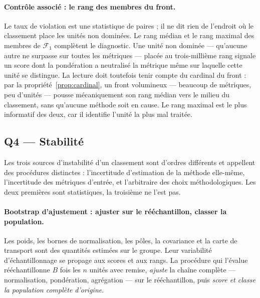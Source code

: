 \documentclass[11pt,a4paper]{article}
\theoremstyle{definition}
\theoremstyle{remark}
\begin{document}
\paragraph{Contrôle associé : le rang des membres du front.} Le taux de violation est une
statistique de paires ; il ne dit rien de l'endroit où le classement place les unités non
dominées. Le rang médian et le rang maximal des membres de $\mathcal{F}_1$ complètent le
diagnostic. Une unité non dominée --- qu'aucune autre ne surpasse sur toutes les
métriques --- placée au trois-millième rang signale un score dont la pondération a
neutralisé la métrique même sur laquelle cette unité se distingue. La lecture doit
toutefois tenir compte du cardinal du front : par la propriété~\ref{prop:cardinal}, un
front volumineux --- beaucoup de métriques, peu d'unités --- pousse mécaniquement son rang
médian vers le milieu du classement, sans qu'aucune méthode soit en cause. Le rang maximal
est le plus informatif des deux, car il identifie l'unité la plus mal traitée.

\bigskip

\subsection{Q4 --- Stabilité}
\label{sec:q4}

\medskip

Les trois sources d'instabilité d'un classement sont d'ordres différents et appellent des
procédures distinctes : l'incertitude d'estimation de la méthode elle-même, l'incertitude
des métriques d'entrée, et l'arbitraire des choix méthodologiques. Les deux premières sont
statistiques, la troisième ne l'est pas.

\bigskip

\paragraph{Bootstrap d'ajustement : ajuster sur le rééchantillon, classer la population.}
Les poids, les bornes de normalisation, les pôles, la covariance et la carte de transport
sont des quantités estimées sur le groupe. Leur variabilité d'échantillonnage se propage
aux scores et aux rangs. La procédure qui l'évalue rééchantillonne $B$ fois les $n$ unités
avec remise, \emph{ajuste} la chaîne complète --- normalisation, pondération, agrégation ---
sur le rééchantillon, puis \emph{score et classe la population complète d'origine}.
\end{document}
